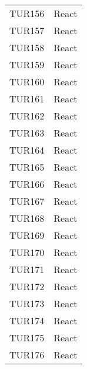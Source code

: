 \documentclass[PianoDiQualifica.tex]{subfiles}
\begin{document}
\begin{longtable}[H]{P{5cm}P{9cm}}
	TUR156 & React \\ 
	TUR157 & React \\ 
	TUR158 & React \\ 
	TUR159 & React \\ 
	TUR160 & React \\ 
	TUR161 & React \\ 
	TUR162 & React \\ 
	TUR163 & React \\ 
	TUR164 & React \\ 
	TUR165 & React \\ 
	TUR166 & React \\ 
	TUR167 & React \\ 
	TUR168 & React \\ 
	TUR169 & React \\ 
	TUR170 & React \\ 
	TUR171 & React \\ 
	TUR172 & React \\ 
	TUR173 & React \\ 
	TUR174 & React \\ 
	TUR175 & React \\ 
	TUR176 & React \\
	

\end{longtable}
\end{document}
